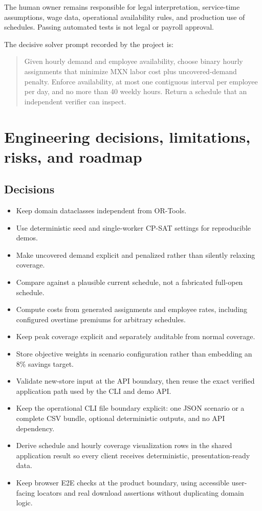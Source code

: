 \documentclass[11pt,a4paper]{article}
\begin{document}
The human owner remains responsible for legal interpretation, service-time assumptions, wage data, operational availability rules, and production use of schedules. Passing automated tests is not legal or payroll approval.

The decisive solver prompt recorded by the project is:
\begin{quote}
Given hourly demand and employee availability, choose binary hourly assignments that minimize MXN labor cost plus uncovered-demand penalty. Enforce availability, at most one contiguous interval per employee per day, and no more than 40 weekly hours. Return a schedule that an independent verifier can inspect.
\end{quote}

\section{Engineering decisions, limitations, risks, and roadmap}
\subsection{Decisions}
\begin{itemize}
  \item Keep domain dataclasses independent from OR-Tools.
  \item Use deterministic seed and single-worker CP-SAT settings for reproducible demos.
  \item Make uncovered demand explicit and penalized rather than silently relaxing coverage.
  \item Compare against a plausible current schedule, not a fabricated full-open schedule.
  \item Compute costs from generated assignments and employee rates, including configured overtime premiums for arbitrary schedules.
  \item Keep peak coverage explicit and separately auditable from normal coverage.
  \item Store objective weights in scenario configuration rather than embedding an 8\% savings target.
  \item Validate new-store input at the API boundary, then reuse the exact verified application path used by the CLI and demo API.
  \item Keep the operational CLI file boundary explicit: one JSON scenario or a complete CSV bundle, optional deterministic outputs, and no API dependency.
  \item Derive schedule and hourly coverage visualization rows in the shared application result so every client receives deterministic, presentation-ready data.
  \item Keep browser E2E checks at the product boundary, using accessible user-facing locators and real download assertions without duplicating domain logic.
\end{itemize}
\end{document}
